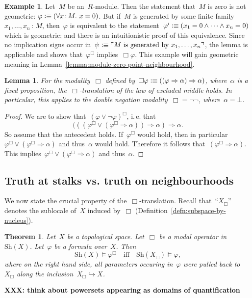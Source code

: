 \documentclass[10pt]{amsart}
\makeatletter
\theoremstyle{definition}
\newtheorem{ex}[defn]{Example}
\theoremstyle{plain}
\newtheorem{lemma}[defn]{Lemma}
\newtheorem{thm}[defn]{Theorem}
\theoremstyle{remark}
\newcommand{\Sh}{\mathrm{Sh}}
\newcommand{\?}{\,{:}\,}
\renewcommand{\_}{\mathpunct{.}\,}
\newcommand{\speak}[1]{\ulcorner\text{\textnormal{#1}}\urcorner}
\newcommand{\ie}{i.\,e.\@\xspace}
\newcommand{\vs}{vs.\@\xspace}
\newcommand{\XXX}[1]{\textbf{XXX: #1}}
\newcommand{\defequiv}{\vcentcolon\equiv}
\makeatother
\begin{document}
\begin{ex}\label{ex:module-zero-geometric}
Let~$M$ be an~$R$-module. Then the statement that~$M$ is zero is not
geometric: $\varphi \defequiv (\forall x\?M\_ x = 0)$. But if~$M$ is generated by some finite
family~$x_1,\ldots,x_n\?M$, then~$\varphi$ is equivalent to the
statement~$\varphi' \defequiv (x_1 = 0
\wedge \cdots \wedge x_n = 0)$ which is geometric; and there is an
intuitionistic proof of this equivalence. Since no implication signs occur
in~$\psi \defequiv \speak{$M$ is generated by~$x_1,\ldots,x_n$}$, the lemma is
applicable and shows that~$\varphi^\Box$ implies~$\Box\varphi$.
This example will gain geometric meaning in
Lemma~\ref{lemma:module-zero-point-neighbourhood}.
\end{ex}

\begin{lemma}For the modality~$\Box$ defined by~$\Box\varphi \defequiv ((\varphi
\Rightarrow \alpha) \Rightarrow \alpha)$, where~$\alpha$ is a fixed
proposition, the~$\Box$-translation of the law of excluded middle holds.
In particular, this applies to the double negation modality~$\Box = \neg\neg$, where~$\alpha =
\bot$.\end{lemma}
\begin{proof}We are to show that~$(\varphi \vee \neg\varphi)^\Box$, \ie that
\[ (((\varphi^\Box \vee (\varphi^\Box \Rightarrow \alpha)) \Longrightarrow
\alpha) \Longrightarrow \alpha. \]
So assume that the antecedent holds. If~$\varphi^\Box$ would hold, then in
particular~$\varphi^\Box \vee (\varphi^\Box \Rightarrow \alpha)$ and thus~$\alpha$
would hold. Therefore it follows that~$(\varphi^\Box \Rightarrow \alpha)$. This
implies~$\varphi^\Box \vee (\varphi^\Box \Rightarrow \alpha)$ and
thus~$\alpha$.
\end{proof}


\subsection{\texorpdfstring{Truth at stalks \vs truth on neighbourhoods}{Truth
at stalks vs. truth on neighbourhoods}}\label{sect:spreading}
We now state the crucial property of the~$\Box$-translation. Recall
that~``$X_\Box$'' denotes the sublocale of~$X$ induced by~$\Box$
(Definition~\ref{defn:subspace-by-nucleus}).
\begin{thm}\label{thm:box-translation-semantically}
Let~$X$ be a topological space. Let~$\Box$ be a modal operator
in~$\Sh(X)$. Let~$\varphi$ be a formula over~$X$. Then
\[ \Sh(X) \models \varphi^\Box \quad\text{iff}\quad
  \Sh(X_\Box) \models \varphi, \]
where on the right hand side, all parameters occuring in~$\varphi$ were pulled
back to~$X_\Box$ along the inclusion~$X_\Box \hookrightarrow X$.
\end{thm}
\XXX{think about powersets appearing as domains of quantification}
\end{document}
